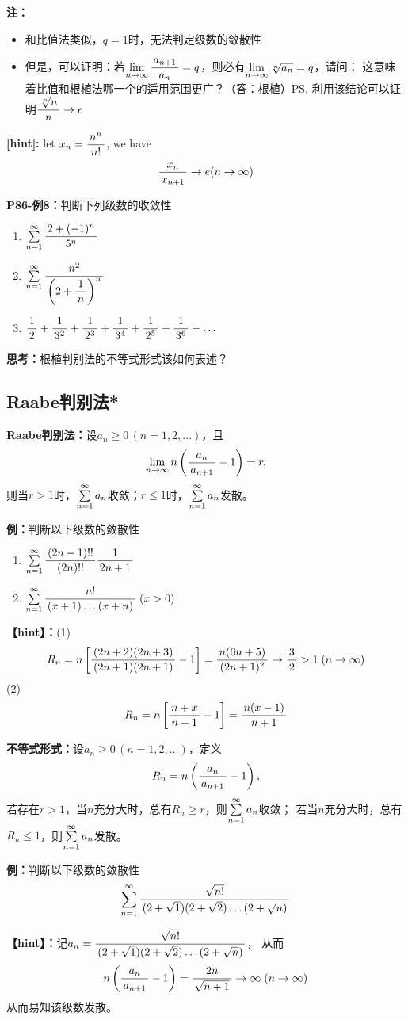 {\bf 注：}
\begin{itemize}
  \setlength{\itemindent}{1cm}
  \item 和比值法类似，$q=1$时，无法判定级数的敛散性
  \item
  但是，可以证明：若$\limn\df{a_{n+1}}{a_n}=q$，则必有$\limn\sqrt[n]{a_n}=q$，请问：
  这意味着比值和根植法哪一个的适用范围更广？（答：根植）\ps{利用该结论可以证明$\df{\sqrt[n]n}n\to e$}
\end{itemize}

{\bf [hint]:} let $x_n=\df{n^n}{n!}$, we have
$$\df{x_{n}}{x_{n+1}}\to e(n\to\infty)$$

{\bf P86-例8：}判断下列级数的收敛性
\begin{enumerate} [(1)]
  \setlength{\itemindent}{1cm}
  \item $\sumn\df{2+(-1)^n}{5^n}$
  \item $\sumn\df{n^2}{\left(2+\df 1n\right)^n}$
  \item $\df 12+\df 1{3^2}+\df 1{2^3}+\df 1{3^4}+\df 1{2^5}+\df 1{3^6}+\ldots$
\end{enumerate}

{\bf 思考：}根植判别法的不等式形式该如何表述？

\begin{shaded}

\subsection{Raabe判别法*}

{\bf Raabe判别法：}设$a_n\geq 0\,(n=1,2,\ldots)$，且
$$\limn n\left(\df{a_n}{a_{n+1}}-1\right)=r,$$
则当$r>1$时，$\sumn a_n$收敛；$r\leq 1$时，$\sumn a_n$发散。	

{\bf 例：}判断以下级数的敛散性
\begin{enumerate}[(1)]
  \setlength{\itemindent}{1cm}
  \item $\sumn\df{(2n-1)!!}{(2n)!!}\df 1{2n+1}$
  \item $\sumn\df{n!}{(x+1)\ldots(x+n)}\;(x>0)$
\end{enumerate}

{\bf 【hint】：}(1)
$$R_n=n\left[\df{(2n+2)(2n+3)}{(2n+1)(2n+1)}-1\right]
=\df{n(6n+5)}{(2n+1)^2}\to\df32>1\;(n\to\infty)$$
(2)
$$R_n=n\left[\df{n+x}{n+1}-1\right]=\df{n(x-1)}{n+1}$$

{\bf 不等式形式：}设$a_n\geq 0\,(n=1,2,\ldots)$，定义
$$R_n=n\left(\df{a_n}{a_{n+1}}-1\right),$$
若存在$r>1$，当$n$充分大时，总有$R_n\geq r$，则$\sumn a_n$收敛；
若当$n$充分大时，总有$R_n\leq 1$，则$\sumn a_n$发散。

{\bf 例：}判断以下级数的敛散性
$$\sumn\df{\sqrt{n!}}{(2+\sqrt 1)(2+\sqrt 2)\ldots(2+\sqrt n)}$$

{\bf 【hint】：}记$a_n=\df{\sqrt{n!}}{(2+\sqrt 1)(2+\sqrt 2)\ldots(2+\sqrt n)}$，
从而
$$n\left(\df{a_n}{a_{n+1}}-1\right)=\df{2n}{\sqrt{n+1}}\to\infty\;(n\to\infty)$$
从而易知该级数发散。

\end{shaded}

